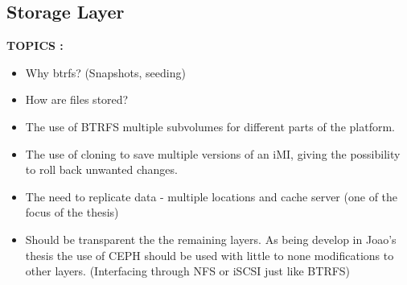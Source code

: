




\subsection{Storage Layer}
\label{sub:icbd_storage_layer}


\textbf{TOPICS :}
\begin{itemize}
	\item Why btrfs? (Snapshots, seeding)
	\item How are files stored?
	\item The use of BTRFS multiple subvolumes for different parts of the platform.
	\item The use of cloning to save multiple versions of an iMI, giving the possibility to roll back unwanted changes.
	\item The need to replicate data - multiple locations and cache server (one of the focus of the thesis)
	\item Should be transparent the the remaining layers. As being develop in Joao's thesis the use of CEPH  should be used with little to none modifications to other layers. (Interfacing through NFS or iSCSI just like BTRFS)
\end{itemize}


